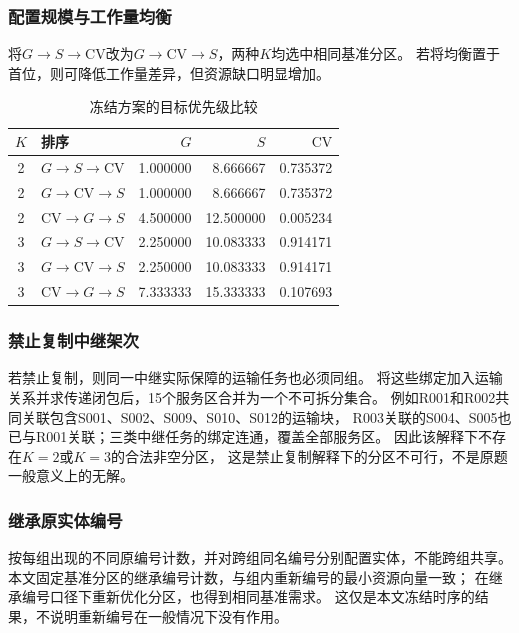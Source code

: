 \subsubsection{配置规模与工作量均衡}
将$G\to S\to\mathrm{CV}$改为$G\to\mathrm{CV}\to S$，两种$K$均选中相同基准分区。
若将均衡置于首位，则可降低工作量差异，但资源缺口明显增加。
\begin{table}[htbp]
\centering
\small
\caption{冻结方案的目标优先级比较}
\label{tab:q4_priority}
\begin{tabular}{clrrr}
\toprule
$K$ & 排序 & $G$ & $S$ & $\mathrm{CV}$ \\
\midrule
2 & $G\to S\to\mathrm{CV}$ & 1.000000 & 8.666667 & 0.735372 \\
2 & $G\to\mathrm{CV}\to S$ & 1.000000 & 8.666667 & 0.735372 \\
2 & $\mathrm{CV}\to G\to S$ & 4.500000 & 12.500000 & 0.005234 \\
3 & $G\to S\to\mathrm{CV}$ & 2.250000 & 10.083333 & 0.914171 \\
3 & $G\to\mathrm{CV}\to S$ & 2.250000 & 10.083333 & 0.914171 \\
3 & $\mathrm{CV}\to G\to S$ & 7.333333 & 15.333333 & 0.107693 \\
\bottomrule
\end{tabular}
\end{table}

\subsubsection{禁止复制中继架次}
若禁止复制，则同一中继实际保障的运输任务也必须同组。
将这些绑定加入运输关系并求传递闭包后，15个服务区合并为一个不可拆分集合。
例如R001和R002共同关联包含S001、S002、S009、S010、S012的运输块，
R003关联的S004、S005也已与R001关联；三类中继任务的绑定连通，覆盖全部服务区。
因此该解释下不存在$K=2$或$K=3$的合法非空分区，
这是禁止复制解释下的分区不可行，不是原题一般意义上的无解。

\subsubsection{继承原实体编号}
按每组出现的不同原编号计数，并对跨组同名编号分别配置实体，不能跨组共享。
本文固定基准分区的继承编号计数，与组内重新编号的最小资源向量一致；
在继承编号口径下重新优化分区，也得到相同基准需求。
这仅是本文冻结时序的结果，不说明重新编号在一般情况下没有作用。

